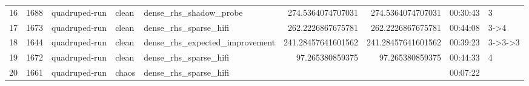 \begin{tabular}{rllllrrll}
16 & 1688 & quadruped-run & clean & dense\_rhs\_shadow\_probe & 274.5364074707031 & 274.5364074707031 & 00:30:43 & 3 \\
17 & 1673 & quadruped-run & clean & dense\_rhs\_sparse\_hifi & 262.2226867675781 & 262.2226867675781 & 00:44:08 & 3->4 \\
18 & 1644 & quadruped-run & clean & dense\_rhs\_expected\_improvement & 241.28457641601562 & 241.28457641601562 & 00:39:23 & 3->3->3 \\
19 & 1672 & quadruped-run & clean & dense\_rhs\_sparse\_hifi & 97.265380859375 & 97.265380859375 & 00:44:33 & 4 \\
20 & 1661 & quadruped-run & chaos & dense\_rhs\_sparse\_hifi &  &  & 00:07:22 &  \\
\bottomrule
\end{tabular}
